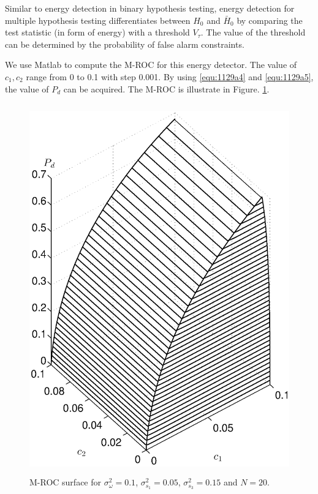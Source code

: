 Similar to energy detection in binary hypothesis testing, energy detection for multiple hypothesis testing differentiates between $H_0$ and $\bar{H}_0$ by comparing the test statistic (in form of energy) with a threshold $V_\tau$. The value of the threshold can be determined by the probability of false alarm constraints.  

We use Matlab to compute the M-ROC for this energy detector. The value of $c_1, c_2$ range from 0 to 0.1 with step 0.001. By using \eqref{equ:1129a4} and \eqref{equ:1129a5}, the value of $P_d$ can be acquired. The M-ROC is illustrate in Figure. \ref{pic:1201a1}.  

\begin{figure}[!t]
\centering
\includegraphics[width=12cm, height=16cm]{4/energy.eps}
\caption{M-ROC surface for $\sigma_\omega^2 = 0.1$, $\sigma_{s_1}^2=0.05$, $\sigma_{s_3}^2=0.15$ and $N = 20$.}
\label{pic:1201a1}
\end{figure}

